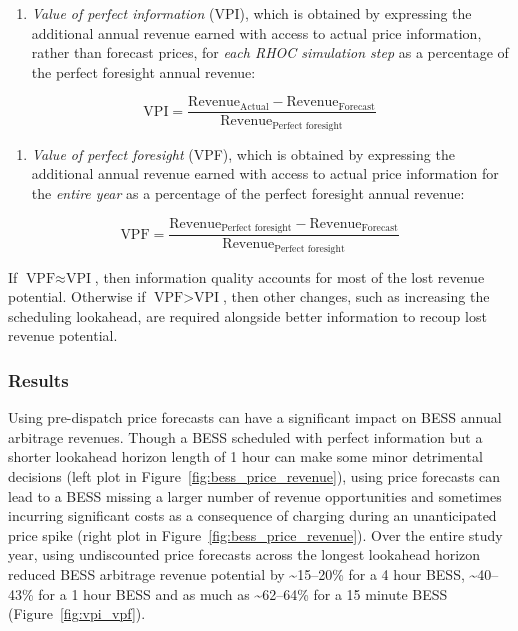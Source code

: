 \documentclass[12pt,a4paper,]{report}
\providecommand{\tightlist}{%
  \setlength{\itemsep}{0pt}\setlength{\parskip}{0pt}}
\begin{document}
\begin{enumerate}
\def\labelenumi{\arabic{enumi}.}
\tightlist
\item
  \emph{Value of perfect information} (VPI), which is obtained by
  expressing the additional annual revenue earned with access to actual
  price information, rather than forecast prices, for \emph{each RHOC
  simulation step} as a percentage of the perfect foresight annual
  revenue:
\end{enumerate}

\[\textrm{VPI} = \frac{\textrm{Revenue}_{\textrm{Actual}} - \textrm{Revenue}_{\textrm{Forecast}}}{\textrm{Revenue}_{\textrm{Perfect foresight}}}\]

\begin{enumerate}
\def\labelenumi{\arabic{enumi}.}
\setcounter{enumi}{1}
\tightlist
\item
  \emph{Value of perfect foresight} (VPF), which is obtained by
  expressing the additional annual revenue earned with access to actual
  price information for the \emph{entire year} as a percentage of the
  perfect foresight annual revenue:
\end{enumerate}

\[\textrm{VPF} = \frac{\textrm{Revenue}_{\textrm{Perfect foresight}} - \textrm{Revenue}_{\textrm{Forecast}}}{\textrm{Revenue}_{\textrm{Perfect foresight}}}\]

If \(\textrm{VPF} \approx \textrm{VPI}\), then information quality
accounts for most of the lost revenue potential. Otherwise if
\(\textrm{VPF} > \textrm{VPI}\), then other changes, such as increasing
the scheduling lookahead, are required alongside better information to
recoup lost revenue potential.

\hypertarget{sec:info-case_study-bess_simulations-method-results}{%
\subsubsection{Results}\label{sec:info-case_study-bess_simulations-method-results}}

Using pre-dispatch price forecasts can have a significant impact on BESS
annual arbitrage revenues. Though a BESS scheduled with perfect
information but a shorter lookahead horizon length of 1 hour can make
some minor detrimental decisions (left plot in
Figure~\ref{fig:bess_price_revenue}), using price forecasts can lead to
a BESS missing a larger number of revenue opportunities and sometimes
incurring significant costs as a consequence of charging during an
unanticipated price spike (right plot in
Figure~\ref{fig:bess_price_revenue}). Over the entire study year, using
undiscounted price forecasts across the longest lookahead horizon
reduced BESS arbitrage revenue potential by \textasciitilde15--20\% for
a 4 hour BESS, \textasciitilde40--43\% for a 1 hour BESS and as much as
\textasciitilde62--64\% for a 15 minute BESS (Figure~\ref{fig:vpi_vpf}).
\end{document}
